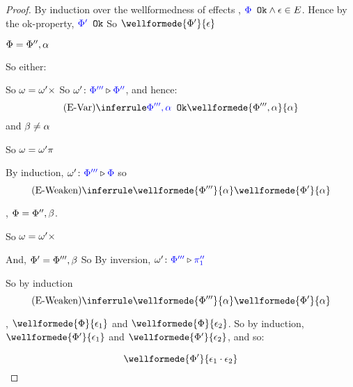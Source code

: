 \documentclass{report}
\begin{document}
\begin{framed}
        \begin{proof}
            
            By induction over the wellformedness of effects
            \case{\eground}
            \bi, ${\color{blue} \Phi} \texttt{ Ok}\wedge\epsilon\in E$.
            Hence by the ok-property, ${\color{blue} \Phi'} \texttt{ Ok}$
            So $\wellformede{\P'}{\e}$
        
            \case{\evar}
        
            $\Phi = \Phi'', \alpha$
        
            So either:
        
                So $\omega = \omega'\times$
                So $\omega' \colon {\color{blue}\Phi'''} \triangleright {\color {blue} \Phi''}$, and hence:
                \begin{equation}
                    \ntreeruleI{\evar}{\ok{\P''', \a}}{\wellformede{\P''',\a}{\a}}
                \end{equation}
             and $\beta \neq\alpha$
        
            So $\omega = \omega'\pi$
        
            By induction, $\omega' \colon {\color{blue}\Phi'''} \triangleright {\color {blue} \Phi}$
            so \begin{equation}
                \ntreeruleI{\eweaken}{\wellformede{\P'''}{\a}}{\wellformede{\P'}{\a}}
            \end{equation}
        
            \case{\eweaken}
        
            \bi, $\Phi = \Phi'', \beta$.
        
            So $\omega = \omega'\times$
        
            And, $\Phi' = \Phi''', \beta$
            So By inversion,  $\omega' \colon {\color{blue}\Phi'''} \triangleright {\color {blue} \pi_1''}$
        
            So by induction
            \begin{equation}
                \ntreeruleI{\eweaken}{\wellformede{\P'''}{\a}}{\wellformede{\P'}{\a}}
            \end{equation}
        
        
            \case{\ecompose}
        
            \bi, $\wellformede{\P}{\e_1}$ and $\wellformede{\P}{\e_2}$. So by induction,
            $\wellformede{\P'}{\e_1}$ and $\wellformede{\P'}{\e_2}$, and so:
        
            \begin{equation}
                \wellformede{\P'}{\e_1\dot\e_2}
            \end{equation}
        \end{proof}
    
\end{framed}
\end{document}
